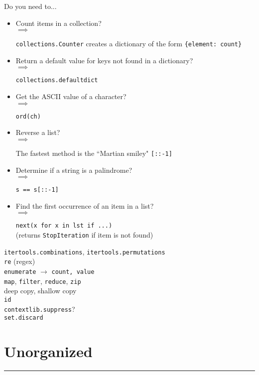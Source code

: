 \documentclass[12pt, titlepage]{article}
\newcommand{\imply}[1]{
  \-\hspace{1em}$\implies$ \parbox[t]{11.2cm}{#1}
}
\begin{document}
Do you need to...
\begin{itemize}
  \item Count items in a collection? \smallskip\\
    \imply{\texttt{collections.Counter} creates a dictionary of the form \texttt{\{element: count\}}}
  \item Return a default value for keys not found in a dictionary? \smallskip\\
    \imply{\texttt{collections.defaultdict}}
  \item Get the ASCII value of a character? \smallskip\\
    \imply{\texttt{ord(ch)}}
  \item Reverse a list? \smallskip\\
    \imply{The fastest method is the ``Martian smiley" \texttt{[::-1]}}
  \item Determine if a string is a palindrome? \smallskip\\
    \imply{\texttt{s == s[::-1]}}
  \item Find the first occurrence of an item in a list? \smallskip\\
      \imply{\texttt{next(x for x in lst if ...)} \\
      (returns \texttt{StopIteration} if item is not found)}
\end{itemize}

\texttt{itertools.combinations}, \texttt{itertools.permutations} \\
\texttt{re} (regex) \\
\texttt{enumerate} $\rightarrow$ \texttt{count, value} \\
\texttt{map}, \texttt{filter}, \texttt{reduce}, \texttt{zip} \\
deep copy, shallow copy \\
\texttt{id} \\
\texttt{contextlib.suppress}? \\
\texttt{set.discard}

\section{Unorganized}
\hrule\vspace{5ex}
\end{document}
